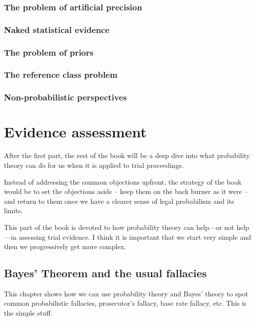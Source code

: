 \documentclass[]{book}
\begin{document}
\section{The problem of artificial precision}

\section{Naked statistical evidence}\label{sec:naked}

\section{The problem of priors}

\section{The reference class problem}

\section{Non-probabilistic perspectives}

\part{Evidence assessment}

After the first part, the rest of the book will
be a deep dive into what probability theory can do for us
when it is applied to trial proceedings.

Instead of addressing the common objections
upfront, the strategy of the book would
be to set the objections
aside -- keep them on the back burner
as it were -- and return to them once we have
a clearer sense of legal probabilism
and its limits.


This part of the book is devoted to how probability
theory can help---or not help---in assessing
trial evidence. I think it is important that
we start very simple and then we progressively
get more complex.

\chapter{Bayes' Theorem and the usual fallacies}

This chapter shows how we can use probability theory
and Bayes' theory to spot common probabilistic fallacies,
prosecutor's fallacy, base rate fallacy, etc.
This is the simple stuff.
\end{document}
